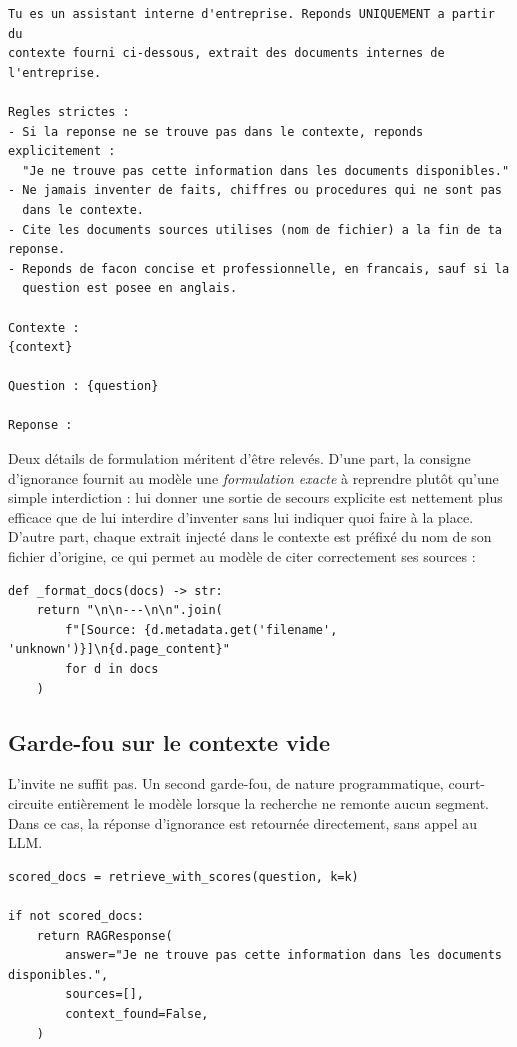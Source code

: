 \begin{lstlisting}[style=plain,caption={Invite système (\texttt{src/rag/pipeline.py})}]
Tu es un assistant interne d'entreprise. Reponds UNIQUEMENT a partir du
contexte fourni ci-dessous, extrait des documents internes de l'entreprise.

Regles strictes :
- Si la reponse ne se trouve pas dans le contexte, reponds explicitement :
  "Je ne trouve pas cette information dans les documents disponibles."
- Ne jamais inventer de faits, chiffres ou procedures qui ne sont pas
  dans le contexte.
- Cite les documents sources utilises (nom de fichier) a la fin de ta reponse.
- Reponds de facon concise et professionnelle, en francais, sauf si la
  question est posee en anglais.

Contexte :
{context}

Question : {question}

Reponse :
\end{lstlisting}

Deux détails de formulation méritent d'être relevés. D'une part, la consigne
d'ignorance fournit au modèle une \emph{formulation exacte} à reprendre plutôt
qu'une simple interdiction : lui donner une sortie de secours explicite est
nettement plus efficace que de lui interdire d'inventer sans lui indiquer quoi
faire à la place. D'autre part, chaque extrait injecté dans le contexte est
préfixé du nom de son fichier d'origine, ce qui permet au modèle de citer
correctement ses sources :

\begin{lstlisting}[style=python,caption={Formatage du contexte avec attribution de source}]
def _format_docs(docs) -> str:
    return "\n\n---\n\n".join(
        f"[Source: {d.metadata.get('filename', 'unknown')}]\n{d.page_content}"
        for d in docs
    )
\end{lstlisting}

\subsection{Garde-fou sur le contexte vide}
\label{sec:garde-fous}

L'invite ne suffit pas. Un second garde-fou, de nature programmatique,
court-circuite entièrement le modèle lorsque la recherche ne remonte aucun
segment. Dans ce cas, la réponse d'ignorance est retournée directement, sans
appel au LLM.

\begin{lstlisting}[style=python,caption={Garde-fou programmatique (\texttt{src/rag/pipeline.py})}]
scored_docs = retrieve_with_scores(question, k=k)

if not scored_docs:
    return RAGResponse(
        answer="Je ne trouve pas cette information dans les documents disponibles.",
        sources=[],
        context_found=False,
    )
\end{lstlisting}

